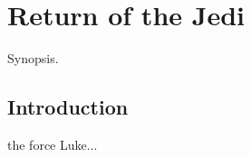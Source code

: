 
\chapter{Return of the Jedi}
	\label{chapter:return-of-the-jedi}%



\begin{synopsis}
	Synopsis.
\end{synopsis}


\section{Introduction}

 the force Luke...

